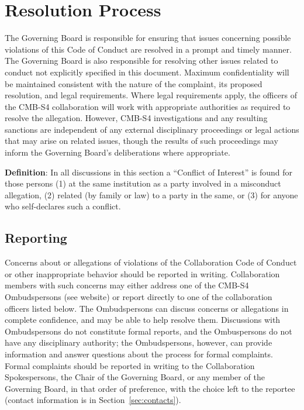 \documentclass[12pt]{article}
\begin{document}
\section{Resolution Process}

The Governing Board is responsible for ensuring that issues concerning possible violations of this Code of Conduct are resolved in a prompt and timely manner. The Governing Board is also responsible for resolving other issues related to conduct not explicitly specified in this document.  Maximum confidentiality will be maintained consistent with the nature of the complaint, its proposed resolution, and legal requirements.  Where legal requirements apply, the officers of the CMB-S4 collaboration will work with appropriate authorities as required to resolve the allegation.  However, CMB-S4 investigations and any resulting sanctions are independent of any external disciplinary proceedings or legal actions that may arise on related issues, though the results of such proceedings may inform the Governing Board’s deliberations where appropriate.


\textbf{Definition}: In all discussions in this section a ``Conflict of Interest'' is found for those persons (1) at the same institution as a party involved in a misconduct allegation, (2) related (by family or law) to a party in the same, or (3) for anyone who self-declares such a conflict. 


\subsection{Reporting}

Concerns about or allegations of violations of the Collaboration Code of Conduct or other inappropriate behavior should be reported in writing. Collaboration members with such concerns may either address one of the CMB-S4 Ombudspersons (see website) or report directly to one of the collaboration officers listed below. The Ombudspersons can discuss concerns or allegations in complete confidence, and may be able to help resolve them. Discussions with Ombudspersons do not constitute formal reports, and the Ombuspersons do not have any disciplinary authority; the Ombudspersons, however, can provide information and answer questions about the process for formal complaints. Formal complaints should be reported in writing to the Collaboration Spokespersons, the Chair of the Governing Board, or any member of the Governing Board, in that order of preference, with the choice left to the reportee (contact information is in Section~\ref{sec:contacts}).
\end{document}
